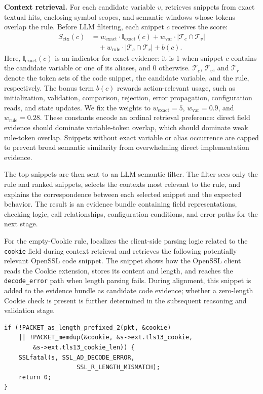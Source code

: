 \noindent \textbf{Context retrieval.}
For each candidate variable $v$, \tool{} retrieves snippets from exact textual
hits, enclosing symbol scopes, and semantic windows whose tokens overlap the
rule. Before LLM filtering, each snippet $c$ receives the score:
\begin{equation}
\begin{aligned}
S_{\mathrm{ctx}}(c)
&=
 w_{\mathrm{exact}}\cdot \mathbb{I}_{\mathrm{exact}}(c)
 +w_{\mathrm{var}}\cdot |\mathcal{T}_c \cap \mathcal{T}_v|\\
&\quad
 +w_{\mathrm{rule}}\cdot |\mathcal{T}_c \cap \mathcal{T}_r|
 +b(c).
\end{aligned}
\end{equation}
Here, \(\mathbb{I}_{\mathrm{exact}}(c)\) is an indicator for exact evidence: it
is 1 when snippet \(c\) contains the candidate variable or one of its aliases,
and 0 otherwise. \(\mathcal{T}_c\), \(\mathcal{T}_v\), and
\(\mathcal{T}_r\) denote the token sets of the code snippet, the candidate
variable, and the rule, respectively. The bonus term \(b(c)\) rewards
action-relevant usage, such as initialization, validation, comparison,
rejection, error propagation, configuration reads, and state updates. We fix
the weights to \(w_{\mathrm{exact}}=5\), \(w_{\mathrm{var}}=0.9\), and
\(w_{\mathrm{rule}}=0.28\). These constants encode an ordinal retrieval
preference: direct field evidence should dominate variable-token overlap,
which should dominate weak rule-token overlap. Snippets without exact variable
or alias occurrence are capped to prevent broad semantic similarity from
overwhelming direct implementation evidence.

The top snippets are then sent to an LLM semantic filter. The filter sees only
the rule and ranked snippets, selects the contexts most relevant to the rule,
and explains the correspondence between each selected snippet and the expected
behavior. The result is an evidence bundle containing field representations,
checking logic, call relationships, configuration conditions, and error paths
for the next stage.

For the empty-Cookie rule, \tool{} localizes the client-side parsing logic related
to the \texttt{cookie} field during context retrieval and retrieves the following 
potentially relevant OpenSSL code snippet. The snippet shows how the OpenSSL client 
reads the Cookie extension, stores its content and length, and reaches the 
\texttt{decode\_error} path when length parsing fails. During alignment, this snippet 
is added to the evidence bundle as candidate code evidence; whether a zero-length 
Cookie check is present is further determined in the subsequent reasoning and 
validation stage.
\begin{lstlisting}[style=jsonsnippet]
if (!PACKET_as_length_prefixed_2(pkt, &cookie)
    || !PACKET_memdup(&cookie, &s->ext.tls13_cookie,
        &s->ext.tls13_cookie_len)) {
    SSLfatal(s, SSL_AD_DECODE_ERROR, 
                    SSL_R_LENGTH_MISMATCH);
    return 0;
}
\end{lstlisting}

